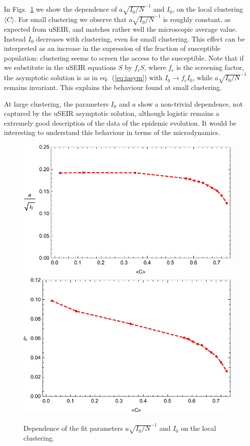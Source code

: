 \documentclass[a4paper,oneside,11pt]{article}
\begin{document}
 In Figs.~\ref{fig:aovI0} we show the dependence of
$a \sqrt{I_0/N}^{-1}$ and $I_0$, on the local clustering $\langle C \rangle$. For small clustering we observe that $a \sqrt{I_0/N}^{-1}$ is roughly constant, as expected from uSEIR, and matches rather well the microscopic average value. Instead $I_0$ decreases with clustering, even for small clustering. This effect can be interpreted as an increase 
in the supression of the fraction of susceptible population: clustering seems to screen the access to the susceptible. Note that if we substitute in the uSEIR equations $S$ by $f_c S$, where $f_c$ is the screening factor, the asymptotic solution is as in eq.~(\ref{eq:iasym})
with $I_0 \rightarrow f_c I_0$, while $a \sqrt{I_0/N}^{-1}$ remains invariant. This explains the behaviour found at small clustering. 

At large clustering, the parameters $I_0$ and $a$ show a non-trivial dependence, not captured by the uSEIR asymptotic solution, although logistic remains a extremely good description of the data of the epidemic evolution. It would be interesting to understand this behaviour in terms of the microdynamics. 


\begin{figure}[htbp]
\centering
 \includegraphics[width=.8\linewidth]{CdepAA.pdf} \includegraphics[width=.75\linewidth]{CdepbAA.pdf}
\caption{Dependence of the fit parameters $a \sqrt{I_0/N}^{-1}$ and $I_0$ on the local clustering. }
\label{fig:aovI0}
\end{figure}
\end{document}
